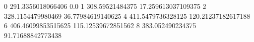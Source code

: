 0 291.3356018066406 0.0
1 308.59521484375 17.259613037109375
2 328.1154479980469 36.77984619140625
4 411.5479736328125 120.21237182617188
6 406.46099853515625 115.12539672851562
8 383.052490234375 91.71688842773438
